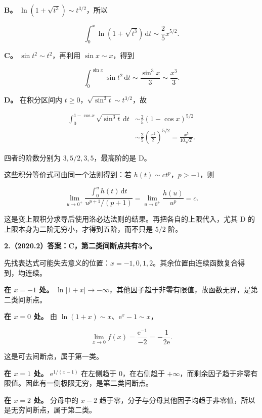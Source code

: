\documentclass[UTF8,11pt,fontset=windows]{ctexart}
\begin{document}
\textbf{B。} $\ln(1+\sqrt{t^3})\sim t^{3/2}$，所以

$$
\int_0^x\ln(1+\sqrt{t^3})\,\mathrm dt\sim\frac25x^{5/2}.
$$

\textbf{C。} $\sin t^2\sim t^2$，再利用 $\sin x\sim x$，得到

$$
\int_0^{\sin x}\sin t^2\,\mathrm dt\sim\frac{\sin^3x}{3}\sim\frac{x^3}{3}.
$$

\textbf{D。} 在积分区间内 $t\ge0$，$\sqrt{\sin^3t}\sim t^{3/2}$，故

$$
\begin{aligned}
\int_0^{1-\cos x}\sqrt{\sin^3t}\,\mathrm dt
&\sim\frac25(1-\cos x)^{5/2}\\
&\sim\frac25\left(\frac{x^2}{2}\right)^{5/2}
=\frac{x^5}{10\sqrt2}.
\end{aligned}
$$

四者的阶数分别为 $3,5/2,3,5$，最高阶的是 D。

这些积分等价式可由同一个法则得到：若 $h(t)\sim c t^p$，$p>-1$，则

$$
\lim_{u\to0^+}\frac{\int_0^u h(t)\,\mathrm dt}{u^{p+1}/(p+1)}
=\lim_{u\to0^+}\frac{h(u)}{u^p}=c.
$$

这是变上限积分求导后使用洛必达法则的结果。再把各自的上限代入，尤其 D 的上限本身为二阶无穷小，才得到五阶，而不只是 $5/2$ 阶。

\clearpage

\textbf{2.（2020.2）答案：C，第二类间断点共有3个。}

先找表达式可能失去意义的位置：$x=-1,0,1,2$。其余位置由连续函数复合得到，均连续。

\textbf{在 $x=-1$ 处。} $\ln|1+x|\to-\infty$，其他因子趋于非零有限值，故函数无界，是第二类间断点。

\textbf{在 $x=0$ 处。} 由 $\ln(1+x)\sim x$、$\mathrm e^x-1\sim x$，

$$
\lim_{x\to0}f(x)
=\frac{\mathrm e^{-1}}{-2}
=-\frac1{2\mathrm e}.
$$

这是可去间断点，属于第一类。

\textbf{在 $x=1$ 处。} $\mathrm e^{1/(x-1)}$ 在左侧趋于 $0$，在右侧趋于 $+\infty$，而剩余因子趋于非零有限值。因此有一侧极限无穷，是第二类间断点。

\textbf{在 $x=2$ 处。} 分母中的 $x-2$ 趋于零，分子与分母其他因子均趋于非零值，所以是无穷间断点，属于第二类。
\end{document}
